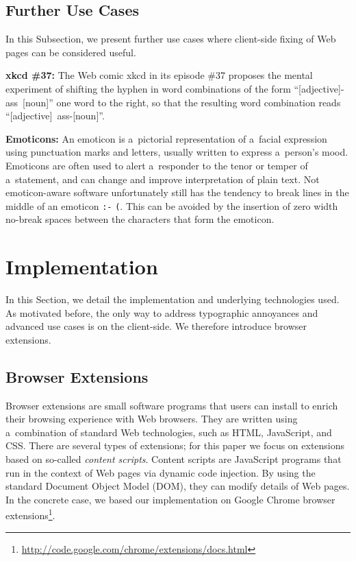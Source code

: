 \documentclass{acm_proc_article-sp}
\let\oldemph\emph
\renewcommand{\emph}[1]{\oldemph{\fontsize{9}{9}\selectfont #1}}
\newcommand{\inlinelistingsize}{\fontsize{8pt}{11pt}}
\let\oldurl\url
\renewcommand{\url}[1]{\inlinelistingsize\oldurl{#1}}
\begin{document}
\subsection{Further Use Cases}
In this Subsection, we present further use cases where client-side fixing of Web pages can be considered useful.

\textbf{xkcd \#37:} The Web comic xkcd in its episode \#37 proposes the mental experiment of shifting the hyphen in word combinations of the form \mbox{``[adjective]-ass [noun]''} one word to the right,
so that the resulting word combination reads \mbox{``[adjective] ass-[noun]''}.

\textbf{Emoticons:} An emoticon is a~pictorial representation of a~facial expression using punctuation marks and letters,
usually written to express a~person's mood.
Emoticons are often used to alert a~responder to the tenor or temper of a~statement,
and can change and improve interpretation of plain text.
Not emoticon-aware software unfortunately still has the tendency to break lines in the middle of an emoticon \texttt{:-} \linebreak %
\texttt{(}. This can be avoided by the insertion of zero width no-break spaces between the characters that form the emoticon.

\section{Implementation}
In this Section, we detail the implementation and underlying technologies used.
As motivated before, the only way to address typographic annoyances and advanced use cases is on the client-side.
We therefore introduce browser extensions.

\subsection{Browser Extensions}
Browser extensions are small software programs that users can install to enrich their browsing experience with Web browsers.
They are written using a~combination of standard Web technologies, such as HTML, JavaScript, and CSS.
There are several types of extensions; for this paper we focus on extensions based on so-called \emph{content scripts}.
Content scripts are JavaScript programs that run in the context of Web pages via dynamic code injection.
By using the standard Document Object Model (DOM), they can modify details of Web pages.
In the concrete case, we based our implementation on Google Chrome browser extensions\footnote{\url{http://code.google.com/chrome/extensions/docs.html}}.
\end{document}
